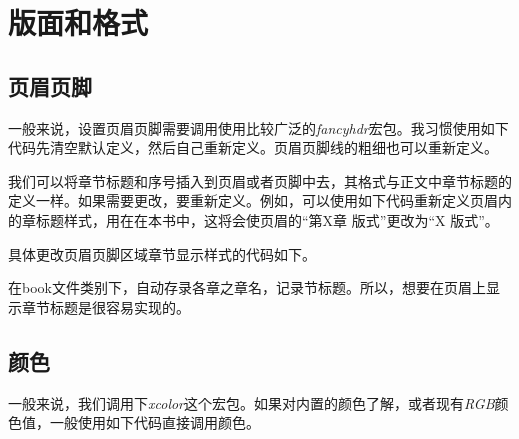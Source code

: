 \newpage

{\let\clearpage\relax \chapter{版面和格式}}

\section{页眉页脚}
一般来说，设置页眉页脚需要调用使用比较广泛的\emph{fancyhdr}宏包。我习惯使用如下代码先清空默认定义，然后自己重新定义。页眉页脚线的粗细也可以重新定义。

\begin{latex}
\usepackage{fancyhdr}
\pagestyle{fancy}
\fancyhf{}                    %
    \lhead{}                %
    \cfoot{}
    \fancyhead[RO,LE]{}        %
    \fancyfoot[LE,RO]{\thepage}
\renewcommand{\headrulewidth}{0.4 pt}
\renewcommand{\footrulewidth}{0.4 pt}
\end{latex}


我们可以将章节标题和序号插入到页眉或者页脚中去，其格式与正文中章节标题的定义一样。如果需要更改，要重新定义。例如，可以使用如下代码重新定义页眉内的章标题样式，用在在本书中，这将会使页眉的“第X章 版式”更改为“X 版式”。 

具体更改页眉页脚区域章节显示样式的代码如下。

\begin{latex}
    \renewcommand{\chaptermark}[1]{\markleft{\thesection.\#1}}
\renewcommand{\chaptermark}[1]{\markboth{\thechapter.\ #1}{节样式空置表示修改章样式}}
\renewcommand{\chaptermark}[1]{\markboth{章样式}{节样式}}
\end{latex}


在book文件类别下，\emph{\leftmark}自动存录各章之章名，\emph{\rightmark}记录节标题。所以，想要在页眉上显示章节标题是很容易实现的。


\begin{latex}
\lhead{\leftmark}            %
\rhead{\rightmark}            %
\end{latex}


\section{颜色}
一般来说，我们调用下\emph{xcolor}这个宏包。如果对内置的颜色了解，或者现有\emph{RGB}颜色值，一般使用如下代码直接调用颜色。

